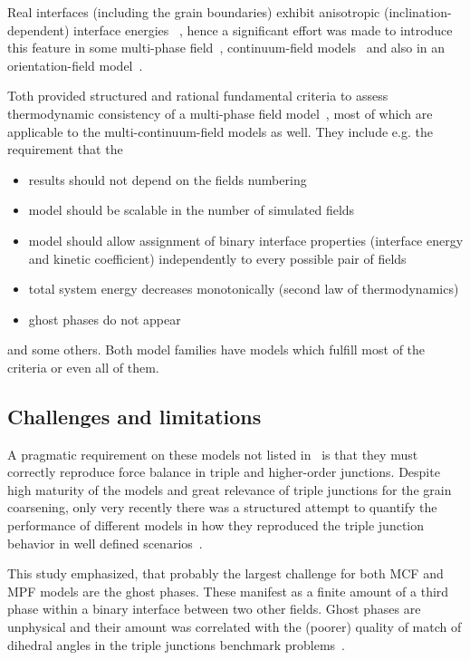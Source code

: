 	Real interfaces (including the grain boundaries) exhibit anisotropic (inclination-dependent) interface energies ~\cite{Olmsted2009,Bulatov2014}, hence a significant effort was made to introduce this feature in some multi-phase field~\cite{Garcke1999,Toth2015,Salama2020,Wendler2011}, continuum-field models~\cite{Kazaryan2000,Moelans2008} and also in an orientation-field model~\cite{Henry2012}.
	
	Toth provided structured and rational fundamental criteria to assess thermodynamic consistency of a multi-phase field model~\cite{Toth2015}, most of which are applicable to the multi-continuum-field models as well. They include e.g. the requirement that the 
	\begin{itemize}
		\item results should not depend on the fields numbering
		\item model should be scalable in the number of simulated fields
		\item model should allow assignment of binary interface properties (interface energy and kinetic coefficient) independently to every possible pair of fields
		\item total system energy decreases monotonically (second law of thermodynamics)
		\item ghost phases do not appear
	\end{itemize}
	and some others. Both model families have models which fulfill most of the criteria or even all of them. 

	\subsection{Challenges and limitations}
	A pragmatic requirement on these models not listed in~\cite{Toth2015} is that they must correctly reproduce force balance in triple and higher-order junctions. Despite high maturity of the models and great relevance of triple junctions for the grain coarsening, only very recently there was a structured attempt to quantify the performance of different models in how they reproduced the triple junction behavior in well defined scenarios~\cite{Daubner2023}. 
	
	This study emphasized, that probably the largest challenge for both MCF and MPF models are the ghost phases. These manifest as a finite amount of a third phase within a binary interface between two other fields. Ghost phases are unphysical and their amount was correlated with the (poorer) quality of match of dihedral angles in the triple junctions benchmark problems~\cite{Daubner2023}. 
	
